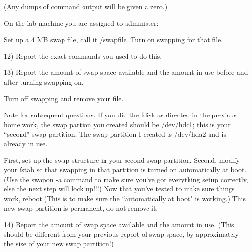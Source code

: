 (Any dumps of command output will be given a zero.)

On the lab machine you are assigned to administer:

Set up a 4 MB swap file, call it {\ltt{}/swapfile}.
Turn on swapping for that file.

12) Report the exact commands you used to do this.

13) Report the amount of swap space available and the amount in use
before and after turning swapping on.

Turn off swapping and remove your file.

Note for subsequent questions:
If you did the {\ltt{}fdisk} as directed in the previous home work,
the swap partion you created should be {\ltt{}/dev/hdc1}; this is your
``second" swap partition.
The swap partition I created is {\ltt{}/dev/hda2} and is already in use.

First, set up the swap structure in your second swap partition.
Second, modify your {\ltt{}fstab} so that swapping in that partition
is turned on automatically at boot.
(Use the {\ltt{}swapon -a} command to make sure you've got everything
setup correctly, else the next step will lock up!!!)
Now that you've tested to make sure things work, reboot
(This is to make sure the ``automatically at boot" is working.)
This new swap partition is permanent, do not remove it.

14) Report the amount of swap space available and the amount in use.
(This should be different from your previous report of swap space, by
approximately the size of your new swap partition!)

\bye
